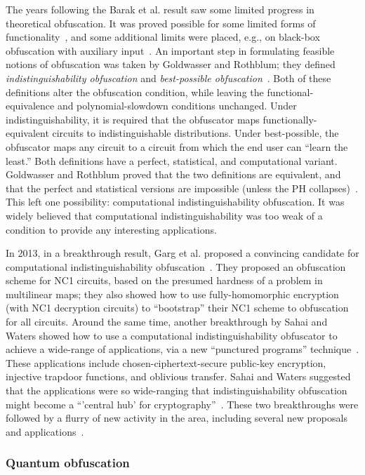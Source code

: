 \documentclass[11pt]{article}
\numberwithin{equation}{section}
\begin{document}
{The years following the Barak et al. result saw some limited progress in theoretical obfuscation. It was proved possible for some limited forms of functionality~\cite{CD08, Wee05}, and some additional limits were placed, e.g., on black-box obfuscation with auxiliary input~\cite{GK05}. An important step in formulating feasible notions of obfuscation was taken by Goldwasser and Rothblum; they defined \emph{indistinguishability obfuscation} and \emph{best-possible obfuscation}~\cite{GR07}. Both of these definitions alter the obfuscation condition, while leaving the functional-equivalence and polynomial-slowdown conditions unchanged. Under indistinguishability, it is required that the obfuscator maps functionally-equivalent circuits to indistinguishable distributions. Under best-possible, the obfuscator maps any circuit to a circuit from which the end user can ``learn the least.'' Both definitions have a perfect, statistical, and computational variant. Goldwasser and Rothblum proved that the two definitions are equivalent, and that the perfect and statistical versions are impossible (unless the PH collapses)~\cite{GR07}. This left one possibility: computational indistinguishability obfuscation. It was widely believed that computational indistinguishability was too weak of a condition to provide any interesting applications.

In 2013, in a breakthrough result, Garg et al. proposed a convincing candidate for computational indistinguishability obfuscation~\cite{GGHRSW13}. They proposed an obfuscation scheme for NC1 circuits, based on the presumed hardness of a problem in multilinear maps; they also showed how to use fully-homomorphic encryption (with NC1 decryption circuits) to ``bootstrap'' their NC1 scheme to obfuscation for all circuits. Around the same time, another breakthrough by Sahai and Waters showed how to use a computational indistinguishability obfuscator to achieve a wide-range of applications, via a new ``punctured programs'' technique~\cite{SW14}. These applications include chosen-ciphertext-secure public-key encryption, injective trapdoor functions, and oblivious transfer. Sahai and Waters suggested that the applications were so wide-ranging that indistinguishability obfuscation might become a ``'central hub' for cryptography''~\cite{SW14}. These two breakthroughs were followed by a flurry of new activity in the area, including several new proposals and applications~\cite{BGKPS14, BCCGKPR14, BZ14, BR14, GGHW14, HSW14}.

\subsubsection{Quantum obfuscation} 

}
\end{document}
